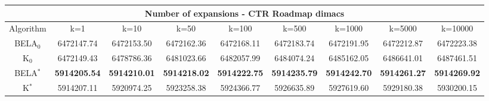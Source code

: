 \begin{tabular}{c|cccccccc}\toprule
\multicolumn{9}{c}{Number of expansions - CTR Roadmap dimacs}\\ \midrule
Algorithm & k=1 & k=10 & k=50 & k=100 & k=500 & k=1000 & k=5000 & k=10000 \\ \midrule
BELA$_0$ & 6472147.74 & 6472153.50 & 6472162.36 & 6472168.11 & 6472183.74 & 6472191.95 & 6472212.87 & 6472223.38 \\
K$_0$ & 6472149.43 & 6478786.36 & 6481023.66 & 6482057.99 & 6484074.24 & 6485162.05 & 6486641.01 & 6487461.51 \\
BELA$^*$ & \textbf{5914205.54} & \textbf{5914210.01} & \textbf{5914218.02} & \textbf{5914222.75} & \textbf{5914235.79} & \textbf{5914242.70} & \textbf{5914261.27} & \textbf{5914269.92} \\
K$^*$ & 5914207.11 & 5920974.25 & 5923258.38 & 5924366.77 & 5926635.89 & 5927619.60 & 5929180.38 & 5930200.15 \\ \bottomrule 
\end{tabular}
